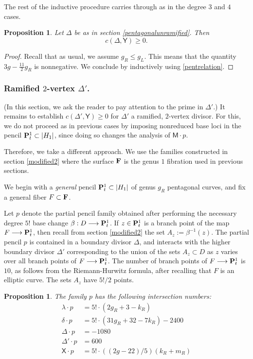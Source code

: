 \documentclass[reqno, 10 pt]{article}
\newtheorem{prop}[thm]{Proposition}
\theoremstyle{definition}
\theoremstyle{remark}
\numberwithin{equation}{section}
\numberwithin{thm}{section}
\numberwithin{prop}{section}
\numberwithin{lem}{section}
\numberwithin{cor}{section}
\numberwithin{conj}{section}
\numberwithin{defn}{section}
\newcommand{\F}{{\mathbf F}}
\renewcommand{\to}{\longrightarrow}
\newcommand{\sfY}{{\mathsf Y}}
\newcommand{\sfX}{{\mathsf X}}
\newcommand{\sfM}{{\mathsf M}}
\renewcommand{\P}{{\bf P}}
\renewcommand{\F}{{\bf F}}
\begin{document}
The rest of the inductive procedure carries through as in the degree $3$ and $4$ cases.

\begin{prop}
Let $\Delta$ be as in section \ref{pentagonalunramified}. Then \[c(\Delta, \sfY) \geq 0.\] 
\end{prop}

\begin{proof}
Recall that as usual, we assume $g_{R} \leq g_{L}$.  This means that the quantity $3g-\frac{11}{2}g_{R}$ is nonnegative. We conclude by inductively using \autoref{pentrelation}.
\end{proof}

\subsubsection{Ramified $2$-vertex $\Delta'$.} (In this section, we ask the reader to pay attention to the prime in $\Delta'$.) It remains to establish $c(\Delta', \sfY) \geq 0$ for $\Delta'$ a ramified, $2$-vertex divisor.  For this, we do not proceed as in previous cases by imposing nonreduced base loci in the pencil $\P^{1}_{t} \subset |H_{1}|$, since doing so changes the analysis of $\sfM \cdot p$. 

Therefore, we take a different approach.  We use the families constructed in section \ref{modified2} where the surface $\F$ is the genus $1$ fibration used in previous sections. 

We begin with a {\sl general} pencil $\P^{1}_{t} \subset |H_{1}|$ of genus $g_{R}$ pentagonal curves, and fix a general fiber $F \subset \F$. 

Let $p$ denote the partial pencil family obtained after performing the necessary degree $5!$ base change $\beta : D \to \P^{1}_{t}$.  If $z \in \P^{1}_{t}$ is a branch point of the map $F \to \P^{1}_{t}$, then recall from section \ref{modified2} the set $A_{z} := \beta^{-1}(z)$.  The partial pencil $p$ is contained in a boundary divisor $\Delta$, and interacts with the higher boundary divisor $\Delta'$ corresponding to the union of the sets $A_{z} \subset D$ as $z$ varies over all branch points of $F \to \P^{1}_{t}$.  The number of branch points of $F \to \P^{1}_{t}$ is $10$, as follows from the Riemann-Hurwitz formula, after recalling that $F$ is an elliptic curve.  The sets $A_{z}$ have $5!/2$ points.

\begin{prop}\label{pentagonalbasechangefamily}
The family $p$ has the following intersection numbers:  
\begin{align*}
\lambda \cdot p &= 5! \cdot (2g_{R} + 3 -  k_{R})\\
\delta \cdot p &= 5! \cdot (31g_{R} + 32 - 7k_{R}) - 2400 \\
\Delta \cdot p &= -1080\\
\Delta' \cdot p &= 600\\
\sfX \cdot p &= 5! \cdot ((2g-22)/5)(k_{R} + m_{R})
\end{align*}

\end{prop}
\end{document}
